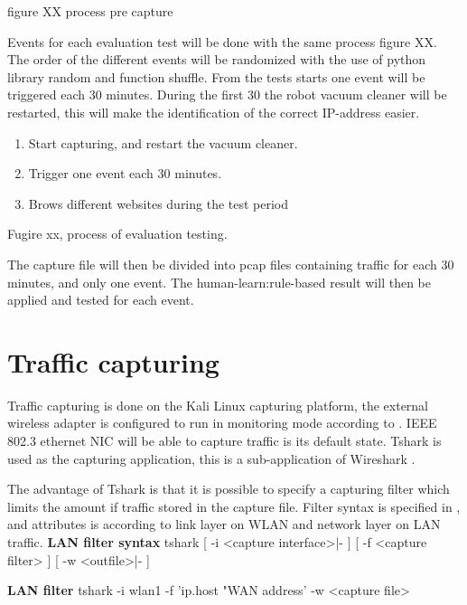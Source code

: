 figure XX process pre capture

Events for each evaluation test will be done with the same process figure XX. The order of the different events will be randomized with the use of python library random and function shuffle. From the tests starts one event will be triggered each 30 minutes. During the first 30 the robot vacuum cleaner will be restarted, this will make the identification of the correct IP-address easier. 

\begin{enumerate}
\item Start capturing, and restart the vacuum cleaner. 
\item Trigger one event each 30 minutes. 
\item Brows different websites during the test period
\end{enumerate}

Fugire xx, process of evaluation testing. 

The capture file will then be divided into pcap files containing traffic for each 30 minutes, and only one event. The human-learn:rule-based result will then be applied and tested for each event. 

\section{Traffic capturing}
Traffic capturing is done on the Kali Linux capturing platform, the external wireless adapter is configured to run in monitoring mode according to \cite{wifi_adapter_monitor_mode}. IEEE 802.3 ethernet NIC will be able to capture traffic is its default state. Tshark is used as the capturing application, this is a sub-application of Wireshark \cite{wireshark}.

The advantage of Tshark is that it is possible to specify a capturing filter which limits the amount if traffic stored in the capture file. Filter syntax is specified in \cite{wireshark}, and attributes is according to link layer on WLAN and network layer on LAN traffic.
\newline
\newline
\textbf{LAN filter syntax}
\newline
tshark [ -i <capture interface>|- ] [ -f <capture filter> ] [ -w <outfile>|- ]
\newline
\newline

\textbf{LAN filter}
\newline
tshark -i wlan1 -f 'ip.host "WAN address' -w <capture file>
\newline
\newline

